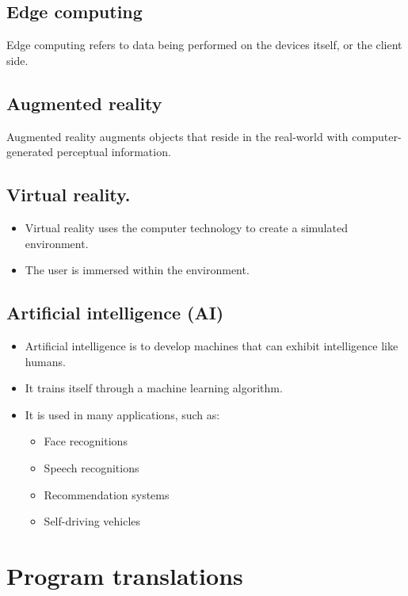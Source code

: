 \documentclass[11pt]{article}
\begin{document}
\subsection{Edge computing}
\label{sec:org5502a4e}
Edge computing refers to data being performed on the devices itself, or the client side.

\subsection{Augmented reality}
\label{sec:orgfebf65b}
Augmented reality augments objects that reside in the real-world with computer-generated perceptual information.

\subsection{Virtual reality.}
\label{sec:orgf6250ee}
\begin{itemize}
\item Virtual reality uses the computer technology to create a simulated environment.
\item The user is immersed within the environment.
\end{itemize}

\subsection{Artificial intelligence (AI)}
\label{sec:orgd647124}
\begin{itemize}
\item Artificial intelligence is to develop machines that can exhibit intelligence like humans.
\item It trains itself through a machine learning algorithm.
\item It is used in many applications, such as:
\begin{itemize}
\item Face recognitions
\item Speech recognitions
\item Recommendation systems
\item Self-driving vehicles
\end{itemize}
\end{itemize}


 \newpage

\section{Program translations}
\label{sec:org463a4a8}
\end{document}
